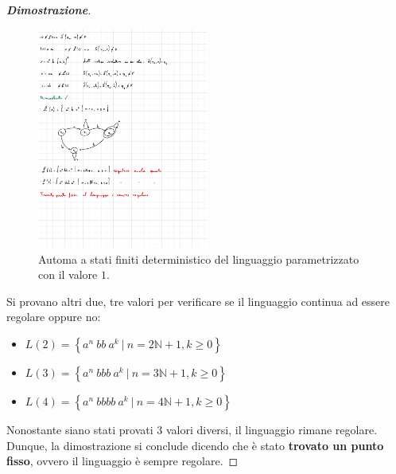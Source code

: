 \documentclass[a4paper]{article}
\begin{document}
\begin{proof}[\textcolor{Blue3}{\textbf{Dimostrazione}}]
		\begin{figure}[!htp]
			\centering
			\includegraphics[width=0.5\textwidth]{img/esercitazioni/03_exe2.pdf}
			\caption{Automa a stati finiti deterministico del linguaggio parametrizzato con il valore $1$.}
		\end{figure}

		\noindent
		Si provano altri due, tre valori per verificare se il linguaggio continua ad essere regolare oppure no:
		
		\begin{itemize}
			\item $L\left(2\right) = \left\{a^{n} \: bb \: a^{k} \: \left| \: n = 2\mathbb{N} + 1, k \ge 0 \right.\right\}$
			\item $L\left(3\right) = \left\{a^{n} \: bbb \: a^{k} \: \left| \: n = 3\mathbb{N} + 1, k \ge 0 \right.\right\}$
			\item $L\left(4\right) = \left\{a^{n} \: bbbb \: a^{k} \: \left| \: n = 4\mathbb{N} + 1, k \ge 0 \right.\right\}$
		\end{itemize}
	
		\noindent
		Nonostante siano stati provati $3$ valori diversi, il linguaggio rimane regolare. Dunque, la dimostrazione si conclude dicendo che è stato \textbf{trovato un punto fisso}, ovvero il linguaggio è sempre regolare.
	\end{proof}

	\newpage
	
\end{document}
